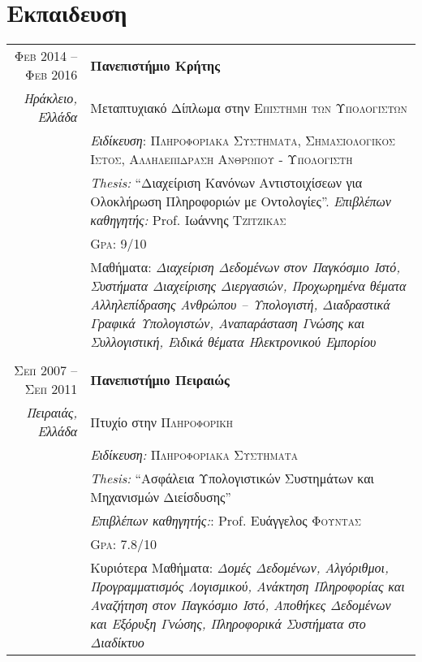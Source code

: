\documentclass[11pt]{article}
\begin{document}

\section{Εκπαιδευση}
\begin{longtable}{r|p{12.5cm}}
\textsc{Φεβ 2014 – Φεβ 2016} & \textbf{Πανεπιστήμιο Κρήτης} \\
\footnotesize{\textit{Ηράκλειο, Ελλάδα}} & Μεταπτυχιακό Δίπλωμα στην \textsc{Επιστημη των Υπολογιστων} \\
& \textit{Ειδίκευση}: \textsc{Πληροφοριακα Συστηματα, Σημασιολογικος Ιστος, Αλληλεπιδραση Ανθρωπου - Υπολογιστη} \\
& \textit{Thesis:} ``Διαχείριση Κανόνων Αντιστοιχίσεων για Ολοκλήρωση Πληροφοριών με Οντολογίες''. \footnotesize \small \textit{Επιβλέπων καθηγητής:} Prof. Ιωάννης \textsc{Τζιτζικας}\\
&\normalsize \textsc{Gpa}: 9/10 \\
&\footnotesize{Μαθήματα: \textit{Διαχείριση Δεδομένων στον Παγκόσμιο Ιστό, Συστήματα Διαχείρισης Διεργασιών, Προχωρημένα θέματα Αλληλεπίδρασης Ανθρώπου – Υπολογιστή, Διαδραστικά Γραφικά Υπολογιστών, Αναπαράσταση Γνώσης και Συλλογιστική, Ειδικά θέματα Ηλεκτρονικού Εμπορίου}}\\

\multicolumn{2}{c}{} \\
\textsc{Σεπ 2007 – Σεπ 2011} & \textbf{Πανεπιστήμιο Πειραιώς} \\
\footnotesize{\textit{Πειραιάς, Ελλάδα}} & Πτυχίο στην \textsc{Πληροφορικη} \\
& \textit{Ειδίκευση:} \textsc{Πληροφοριακα Συστηματα} \\
& \textit{Thesis:} ``Ασφάλεια Υπολογιστικών Συστημάτων και Μηχανισμών Διείσδυσης'' \\
& \footnotesize \small \textit{Επιβλέπων καθηγητής:}: Prof. Ευάγγελος \textsc{Φουντας}\\
&\normalsize \textsc{Gpa}: 7.8/10 \\
&\footnotesize{Κυριότερα Μαθήματα: \textit{Δομές Δεδομένων, Αλγόριθμοι, Προγραμματισμός Λογισμικού, Ανάκτηση Πληροφορίας και Αναζήτηση στον Παγκόσμιο Ιστό, Αποθήκες Δεδομένων και Εξόρυξη Γνώσης, Πληροφορικά Συστήματα στο Διαδίκτυο}}

\end{longtable}
\end{document}
